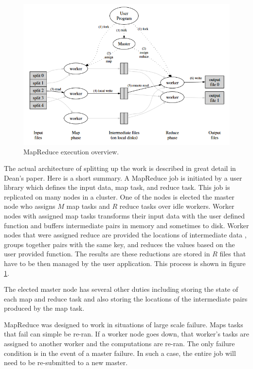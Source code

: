 \documentclass[]{article}
\begin{document}
\begin{figure}
    \centering
    \includegraphics[width=1.0\linewidth]{img/mr-execution}
    \caption[MapReduce execution overview.]{MapReduce execution overview. \cite{dean2008mapreduce}}
    \label{fig:mr-execution}
\end{figure}

The actual architecture of splitting up the work is described in great detail in Dean's paper. Here is a short summary. A MapReduce job is initiated by a user library which defines the input data, map task, and reduce task. This job is replicated on many nodes in a cluster. One of the nodes is elected the master node who assigns $M$ map tasks and $R$ reduce tasks over idle workers. Worker nodes with assigned map tasks transforms their input data with the user defined function and buffers intermediate pairs in memory and sometimes to disk. Worker nodes that were assigned reduce are provided the locations of intermediate data , groups together pairs with the same key, and reduces the values based on the user provided function. The results are these reductions are stored in $R$ files that have to be then managed by the user application. This process is shown in figure \ref{fig:mr-execution}.

The elected master node has several other duties including storing the state of each map and reduce task and also storing the locations of the intermediate pairs produced by the map task.

MapReduce was designed to work in situations of large scale failure. Maps tasks that fail can simple be re-ran. If a worker node goes down, that worker's tasks are assigned to another worker and the computations are re-ran. The only failure condition is in the event of a master failure. In such a case, the entire job will need to be re-submitted to a new master.
\end{document}
